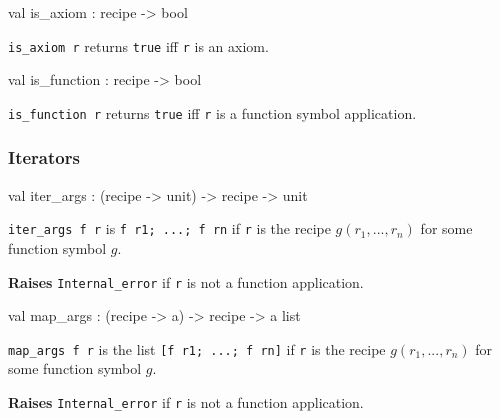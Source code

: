 \label{val:Recipe.is-underscoreaxiom}\begin{ocamldoccode}
val is_axiom : recipe -> bool
\end{ocamldoccode}
\begin{ocamldocdescription}
{\tt{is\_axiom r}} returns {\tt{true}} iff {\tt{r}} is an axiom.


\end{ocamldocdescription}




\label{val:Recipe.is-underscorefunction}\begin{ocamldoccode}
val is_function : recipe -> bool
\end{ocamldoccode}
\begin{ocamldocdescription}
{\tt{is\_function r}} returns {\tt{true}} iff {\tt{r}} is a function symbol application.


\end{ocamldocdescription}




\subsubsection{Iterators}




\label{val:Recipe.iter-underscoreargs}\begin{ocamldoccode}
val iter_args : (recipe -> unit) -> recipe -> unit
\end{ocamldoccode}
\begin{ocamldocdescription}
{\tt{iter\_args f r}} is {\tt{f r1; ...; f rn}} if {\tt{r}} is
    the recipe $g(r_1,...,r_n)$  for some function symbol $g$. 

{\bf Raises} {\tt{Internal\_error}} if {\tt{r}} is not a function application.


\end{ocamldocdescription}




\label{val:Recipe.map-underscoreargs}\begin{ocamldoccode}
val map_args : (recipe -> {\textquotesingle}a) -> recipe -> {\textquotesingle}a list
\end{ocamldoccode}
\begin{ocamldocdescription}
{\tt{map\_args f r}} is the list {\tt{[f r1; ...; f rn]}} if {\tt{r}} is
    the recipe $g(r_1,...,r_n)$  for some function symbol $g$. 

{\bf Raises} {\tt{Internal\_error}} if {\tt{r}} is not a function application.


\end{ocamldocdescription}




